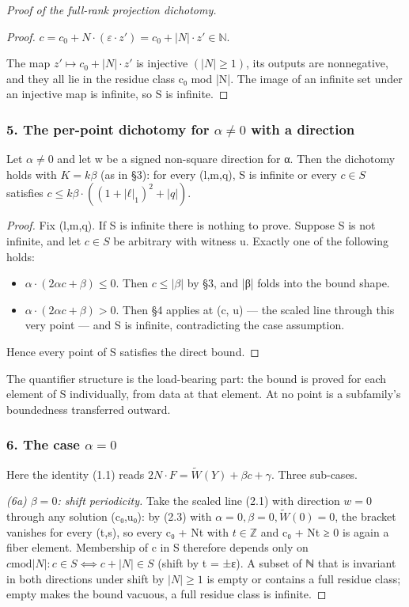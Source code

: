 \begin{proof}[Proof of the full-rank projection dichotomy]
\begin{proof}
$c = c_{0} + N·(ε·z′) = c_{0} + |N|·z′ ∈ ℕ$.

The map $z′ ↦ c_{0} + |N|·z′$ is injective $(|N| ≥ 1)$, its outputs are nonnegative, and they all lie in the residue class c₀ mod |N|. The image of an infinite set under an injective map is infinite, so S is infinite.

\end{proof}
\subsubsection*{5. The per-point dichotomy for $α ≠ 0$ with a direction}
\begin{proposition*}
Let $α ≠ 0$ and let w be a signed non-square direction for α. Then the dichotomy holds with $K = kβ$ (as in §3): for every (l,m,q), S is infinite or every $c ∈ S$ satisfies $c ≤ kβ·((1+|ℓ|_{1})^{2}+|q|)$.

\end{proposition*}
\begin{proof}
Fix (l,m,q). If S is infinite there is nothing to prove. Suppose S is not infinite, and let $c ∈ S$ be arbitrary with witness u. Exactly one of the following holds:

\begin{itemize}
\item $α·(2αc+β) ≤ 0$. Then $c ≤ |β|$ by §3, and |β| folds into the bound shape.
\item $α·(2αc+β) > 0$. Then §4 applies at (c, u) — the scaled line through this
very point — and S is infinite, contradicting the case assumption.

\end{itemize}
Hence every point of S satisfies the direct bound.

\end{proof}
The quantifier structure is the load-bearing part: the bound is proved for each element of S individually, from data at that element. At no point is a subfamily's boundedness transferred outward.

\subsubsection*{6. The case $α = 0$}
Here the identity (1.1) reads $2N·F = \tilde{W}(Y) + βc + γ$. Three sub-cases.

\emph{(6a) $β = 0$: shift periodicity.} Take the scaled line (2.1) with direction $w = 0$ through any solution (c₀,u₀): by (2.3) with $α = 0, β = 0, \tilde{W}(0) = 0$, the bracket vanishes for every (t,s), so every c₀ + Nt with $t ∈ ℤ$ and c₀ + Nt ≥ 0 is again a fiber element. Membership of c in S therefore depends only on $c \mathrm{mod} |N|: c ∈ S ⟺ c + |N| ∈ S$ (shift by t = ±ε). A subset of ℕ that is invariant in both directions under shift by $|N| ≥ 1$ is empty or contains a full residue class; empty makes the bound vacuous, a full residue class is infinite.


\end{proof}
